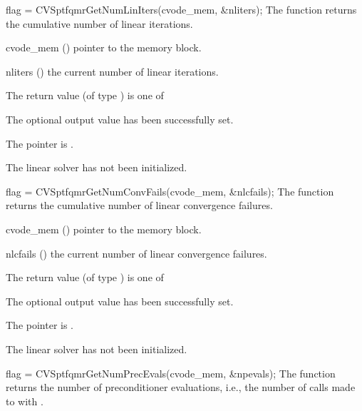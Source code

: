 {
  flag = CVSptfqmrGetNumLinIters(cvode\_mem, \&nliters);
}
{
  The function  returns the
  cumulative number of linear iterations.
}
{
  \begin{args}
  \item[cvode\_mem] ()
    pointer to the {\cvodes} memory block.
  \item[nliters] ()
    the current number of linear iterations.
  \end{args}
}
{
  The return value  (of type ) is one of
  \begin{args}
  \item[\Id{CVSPTFQMR\_SUCCESS}] 
    The optional output value has been successfully set.
  \item[\Id{CVSPTFQMR\_MEM\_NULL}]
    The  pointer is .
  \item[\Id{CVSPTFQMR\_LMEM\_NULL}]
    The {\cvsptfqmr} linear solver has not been initialized.
  \end{args}
}
{}
{
  flag = CVSptfqmrGetNumConvFails(cvode\_mem, \&nlcfails);
}
{
  The function  returns the
  cumulative number of linear convergence failures.
}
{
  \begin{args}
  \item[cvode\_mem] ()
    pointer to the {\cvodes} memory block.
  \item[nlcfails] ()
    the current number of linear convergence failures.
  \end{args}
}
{
  The return value  (of type ) is one of
  \begin{args}
  \item[\Id{CVSPTFQMR\_SUCCESS}] 
    The optional output value has been successfully set.
  \item[\Id{CVSPTFQMR\_MEM\_NULL}]
    The  pointer is .
  \item[\Id{CVSPTFQMR\_LMEM\_NULL}]
    The {\cvsptfqmr} linear solver has not been initialized.
  \end{args}
}
{}
{
  flag = CVSptfqmrGetNumPrecEvals(cvode\_mem, \&npevals);
}
{
  The function  returns the
  number of preconditioner evaluations, i.e., the number of 
  calls made to  with .
}
